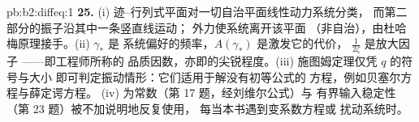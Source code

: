\begin{solution}{pb:b2:diffeq:1}
\textbf{25.} (i) 迹--行列式平面对一切自治平面线性动力系统分类，
而第二部分的振子沿其中一条竖直线运动；
外力使系统离开该平面
（非自治），由杜哈梅原理接手。(ii) $\gamma_*$ 是
系统偏好的频率，$A(\gamma_*)$ 是激发它的代价，
$\frac{1}{2\zeta}$ 是放大因子
——即工程师所称的
品质因数，亦即的尖锐程度。(iii) 施图姆定理仅凭 $q$ 的符号与大小
即可判定振动情形：它们适用于解没有初等公式的
方程，例如贝塞尔方程与薛定谔方程。
(iv) 为常数（第 17 题，经刘维尔公式）与
有界输入稳定性（第 23 题）被不加说明地反复使用，
每当本书遇到变系数方程或
扰动系统时。
\end{solution}
